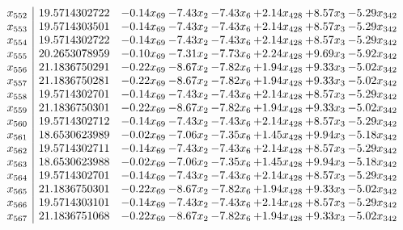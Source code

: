 \documentclass[8pt]{article}
\begin{document}
\[\begin{array}{c| c c@{\hskip 2pt} c@{\hskip 2pt} c@{\hskip 2pt} c@{\hskip 2pt} c@{\hskip 2pt} c@{\hskip 2pt} }
 x_{552}   &  19.5714302722 & -0.14 x_{69} & -7.43 x_{2} & -7.43 x_{6} & +  2.14 x_{428} & +  8.57 x_{3} & -5.29 x_{342}\\
 x_{553}   &  19.5714303501 & -0.14 x_{69} & -7.43 x_{2} & -7.43 x_{6} & +  2.14 x_{428} & +  8.57 x_{3} & -5.29 x_{342}\\
 x_{554}   &  19.5714302722 & -0.14 x_{69} & -7.43 x_{2} & -7.43 x_{6} & +  2.14 x_{428} & +  8.57 x_{3} & -5.29 x_{342}\\
 x_{555}   &  20.2653078959 & -0.10 x_{69} & -7.31 x_{2} & -7.73 x_{6} & +  2.24 x_{428} & +  9.69 x_{3} & -5.92 x_{342}\\
 x_{556}   &  21.1836750291 & -0.22 x_{69} & -8.67 x_{2} & -7.82 x_{6} & +  1.94 x_{428} & +  9.33 x_{3} & -5.02 x_{342}\\
 x_{557}   &  21.1836750281 & -0.22 x_{69} & -8.67 x_{2} & -7.82 x_{6} & +  1.94 x_{428} & +  9.33 x_{3} & -5.02 x_{342}\\
 x_{558}   &  19.5714302701 & -0.14 x_{69} & -7.43 x_{2} & -7.43 x_{6} & +  2.14 x_{428} & +  8.57 x_{3} & -5.29 x_{342}\\
 x_{559}   &  21.1836750301 & -0.22 x_{69} & -8.67 x_{2} & -7.82 x_{6} & +  1.94 x_{428} & +  9.33 x_{3} & -5.02 x_{342}\\
 x_{560}   &  19.5714302712 & -0.14 x_{69} & -7.43 x_{2} & -7.43 x_{6} & +  2.14 x_{428} & +  8.57 x_{3} & -5.29 x_{342}\\
 x_{561}   &  18.6530623989 & -0.02 x_{69} & -7.06 x_{2} & -7.35 x_{6} & +  1.45 x_{428} & +  9.94 x_{3} & -5.18 x_{342}\\
 x_{562}   &  19.5714302711 & -0.14 x_{69} & -7.43 x_{2} & -7.43 x_{6} & +  2.14 x_{428} & +  8.57 x_{3} & -5.29 x_{342}\\
 x_{563}   &  18.6530623988 & -0.02 x_{69} & -7.06 x_{2} & -7.35 x_{6} & +  1.45 x_{428} & +  9.94 x_{3} & -5.18 x_{342}\\
 x_{564}   &  19.5714302701 & -0.14 x_{69} & -7.43 x_{2} & -7.43 x_{6} & +  2.14 x_{428} & +  8.57 x_{3} & -5.29 x_{342}\\
 x_{565}   &  21.1836750301 & -0.22 x_{69} & -8.67 x_{2} & -7.82 x_{6} & +  1.94 x_{428} & +  9.33 x_{3} & -5.02 x_{342}\\
 x_{566}   &  19.5714303101 & -0.14 x_{69} & -7.43 x_{2} & -7.43 x_{6} & +  2.14 x_{428} & +  8.57 x_{3} & -5.29 x_{342}\\
 x_{567}   &  21.1836751068 & -0.22 x_{69} & -8.67 x_{2} & -7.82 x_{6} & +  1.94 x_{428} & +  9.33 x_{3} & -5.02 x_{342}\\

\end{array}\]
\end{document}
